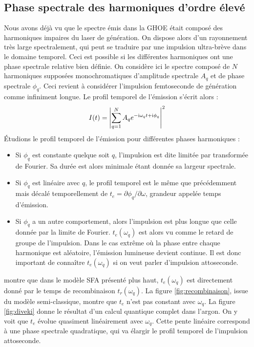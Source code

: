 \subsection{Phase spectrale des harmoniques d'ordre élevé}
Nous avons déjà vu que le spectre émis dans la GHOE était composé des harmoniques impaires du laser de génération. On dispose alors d'un rayonnement très large spectralement, qui peut se traduire par une impulsion ultra-brève dans le domaine temporel. Ceci est possible si les différentes harmoniques ont une phase spectrale relative bien définie. On considère ici le spectre composé de $N$ harmoniques supposées monochromatiques d'amplitude spectrale $A_q$ et de phase spectrale $\phi_q$. Ceci revient à considérer l'impulsion femtoseconde de génération comme infiniment longue. Le profil temporel de l'émission s'écrit alors :
\begin{equation}
I(t) = \left|\sum_{q=1}^N A_q e^{-\mathrm{i}\omega_q t+\mathrm{i}\phi_q}\right|^2
\end{equation}
\'Etudions le profil temporel de l'émission pour différentes phases harmoniques :
\begin{itemize}
\renewcommand{\labelitemi}{$\bullet$}
\setlength\itemsep{1em}
\item Si $\phi_q$ est constante quelque soit $q$, l'impulsion est dite limitée par transformée de Fourier. Sa durée est alors minimale étant donnée sa largeur spectrale.
\item Si $\phi_q$ est linéaire avec $q$, le profil temporel est le même que précédemment mais décalé temporellement de $t_e = \partial\phi_q/\partial\omega$, grandeur appelée temps d'émission.
\item Si $\phi_q$ a un autre comportement, alors l'impulsion est plus longue que celle donnée par la limite de Fourier. $t_e(\omega_q)$ est alors vu comme le retard de groupe de l'impulsion. Dans le cas extrême où la phase entre chaque harmonique est aléatoire, l'émission lumineuse devient continue. Il est donc important de connaître $t_e(\omega_q)$ si on veut parler d'impulsion attoseconde.
\end{itemize}
\vspace{\baselineskip}
 montre que dans le modèle SFA présenté plus haut, $t_e(\omega_q)$ est directement donné par le temps de recombinaison $t_r(\omega_q)$. La figure \ref{fig:recombinaison}, issue du modèle semi-classique, montre que $t_e$ n'est pas constant avec $\omega_q$. La figure \ref{fig:diveki} donne le résultat d'un calcul quantique complet dans l'argon. On y voit que $t_e$ évolue quasiment linéairement avec $\omega_q$. Cette pente linéaire correspond à une phase spectrale quadratique, qui va élargir le profil temporel de l'impulsion attoseconde.

